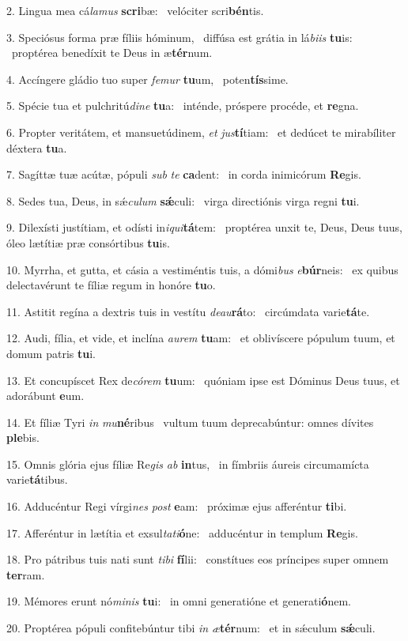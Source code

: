 2. Lingua mea cá\textit{la}\textit{mus} \textbf{scri}bæ: \ast\  velóciter scri\textbf{bén}tis.\

3. Speciósus forma præ fíliis hóminum, \dag\  diffúsa est grátia in lá\textit{bi}\textit{is} \textbf{tu}is: \ast\  proptérea benedíxit te Deus in æ\textbf{tér}num.\

4. Accíngere gládio tuo super \textit{fe}\textit{mur} \textbf{tu}um, \ast\  poten\textbf{tís}sime.\

5. Spécie tua et pulchritú\textit{di}\textit{ne} \textbf{tu}a: \ast\  inténde, próspere procéde, et \textbf{re}gna.\

6. Propter veritátem, et mansuetúdinem, \textit{et} \textit{jus}\textbf{tí}tiam: \ast\  et dedúcet te mirabíliter déxtera \textbf{tu}a.\

7. Sagíttæ tuæ acútæ, pópuli \textit{sub} \textit{te} \textbf{ca}dent: \ast\  in corda inimicórum \textbf{Re}gis.\

8. Sedes tua, Deus, in sǽ\textit{cu}\textit{lum} \textbf{sǽ}culi: \ast\  virga directiónis virga regni \textbf{tu}i.\

9. Dilexísti justítiam, et odísti in\textit{i}\textit{qui}\textbf{tá}tem: \ast\  proptérea unxit te, Deus, Deus tuus, óleo lætítiæ præ consórtibus \textbf{tu}is.\

10. Myrrha, et gutta, et cásia a vestiméntis tuis, a dómi\textit{bus} \textit{e}\textbf{búr}neis: \ast\  ex quibus delectavérunt te fíliæ regum in honóre \textbf{tu}o.\

11. Astitit regína a dextris tuis in vestítu \textit{de}\textit{au}\textbf{rá}to: \ast\  circúmdata varie\textbf{tá}te.\

12. Audi, fília, et vide, et inclína \textit{au}\textit{rem} \textbf{tu}am: \ast\  et oblivíscere pópulum tuum, et domum patris \textbf{tu}i.\

13. Et concupíscet Rex de\textit{có}\textit{rem} \textbf{tu}um: \ast\  quóniam ipse est Dóminus Deus tuus, et adorábunt \textbf{e}um.\

14. Et fíliæ Tyri \textit{in} \textit{mu}\textbf{né}ribus \ast\  vultum tuum deprecabúntur: omnes dívites \textbf{ple}bis.\

15. Omnis glória ejus fíliæ Re\textit{gis} \textit{ab} \textbf{in}tus, \ast\  in fímbriis áureis circumamícta varie\textbf{tá}tibus.\

16. Adducéntur Regi vírgi\textit{nes} \textit{post} \textbf{e}am: \ast\  próximæ ejus afferéntur \textbf{ti}bi.\

17. Afferéntur in lætítia et exsul\textit{ta}\textit{ti}\textbf{ó}ne: \ast\  adducéntur in templum \textbf{Re}gis.\

18. Pro pátribus tuis nati sunt \textit{ti}\textit{bi} \textbf{fí}lii: \ast\  constítues eos príncipes super omnem \textbf{ter}ram.\

19. Mémores erunt nó\textit{mi}\textit{nis} \textbf{tu}i: \ast\  in omni generatióne et generati\textbf{ó}nem.\

20. Proptérea pópuli confitebúntur tibi \textit{in} \textit{æ}\textbf{tér}num: \ast\  et in sǽculum \textbf{sǽ}culi.\

